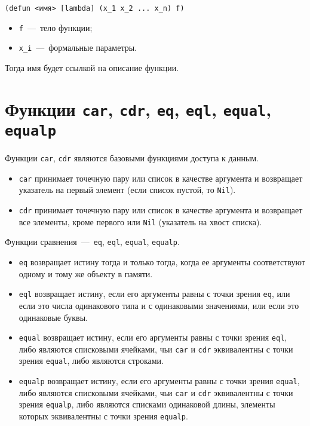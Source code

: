\begin{code}
\begin{verbatim}
(defun <имя> [lambda] (x_1 x_2 ... x_n) f)
\end{verbatim}
\end{code}

\begin{itemize}
	\item \texttt{f}~---~тело функции;
	\item \texttt{x\_i}~---~формальные параметры. 
\end{itemize}

Тогда имя будет ссылкой на описание функции.

\section{Функции \texttt{car}, \texttt{cdr}, \texttt{eq}, \texttt{eql}, \texttt{equal}, \texttt{equalp}}
Функции \texttt{car}, \texttt{cdr} являются базовыми функциями доступа к данным.

\begin{itemize}
	\item \texttt{car} принимает точечную пару или список в качестве аргумента и возвращает указатель на первый элемент (если список пустой, то \texttt{Nil}).
	\item \texttt{cdr} принимает точечную пару или список в качестве аргумента и возвращает все элементы, кроме первого или \texttt{Nil} (указатель на хвост списка).
\end{itemize}

Функции сравнения~---~\texttt{eq}, \texttt{eql}, \texttt{equal}, \texttt{equalp}.

\begin{itemize}
	\item \texttt{eq} возвращает истину тогда и только тогда, когда ее аргументы соответствуют одному и тому же объекту в памяти.
	\item \texttt{eql} возвращает истину, если его аргументы равны с точки зрения \texttt{eq}, или если это числа одинакового типа и с одинаковыми значениями, или если это одинаковые буквы.
	\item \texttt{equal} возвращает истину, если его аргументы равны с точки зрения \texttt{eql},  либо являются списковыми ячейками, чьи \texttt{car} и \texttt{cdr} эквивалентны с точки зрения \texttt{equal}, либо являются строками.
	\item \texttt{equalp} возвращает истину, если его аргументы равны с точки зрения \texttt{equal},  либо являются списковыми ячейками, чьи \texttt{car} и \texttt{cdr} эквивалентны с точки зрения \texttt{equalp}, либо являются списками одинаковой длины, элементы которых эквивалентны с точки зрения \texttt{equalp}.
\end{itemize}

